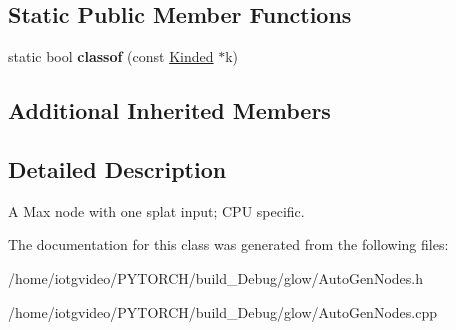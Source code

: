 \subsection*{Static Public Member Functions}
\begin{DoxyCompactItemize}
\item 
\mbox{\label{classglow_1_1_c_p_u_max_splat_node_a48630dfe79ed01a9cdc3afa2684d5510}} 
static bool {\bfseries classof} (const \hyperlink{classglow_1_1_kinded}{Kinded} $\ast$k)
\end{DoxyCompactItemize}
\subsection*{Additional Inherited Members}


\subsection{Detailed Description}
A Max node with one splat input; C\+PU specific. 

The documentation for this class was generated from the following files\+:\begin{DoxyCompactItemize}
\item 
/home/iotgvideo/\+P\+Y\+T\+O\+R\+C\+H/build\+\_\+\+Debug/glow/Auto\+Gen\+Nodes.\+h\item 
/home/iotgvideo/\+P\+Y\+T\+O\+R\+C\+H/build\+\_\+\+Debug/glow/Auto\+Gen\+Nodes.\+cpp\end{DoxyCompactItemize}

